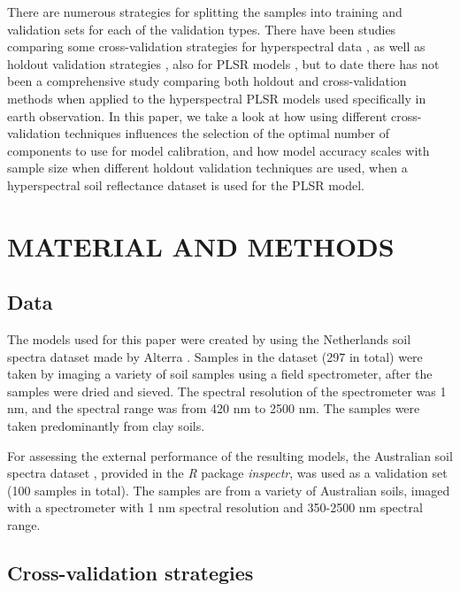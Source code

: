 \documentclass{isprs}
\begin{document}
There are numerous strategies for splitting the samples into training and validation sets for each of the validation types. There have been studies comparing some cross-validation strategies for hyperspectral data \cite{molinaro2005prediction}, as well as holdout validation strategies \cite{roy2008exploring}, also for PLSR models \cite{clark2003boosted}, but to date there has not been a comprehensive study comparing both holdout and cross-validation methods when applied to the hyperspectral PLSR models used specifically in earth observation. In this paper, we take a look at how using different cross-validation techniques influences the selection of the optimal number of components to use for model calibration, and how model accuracy scales with sample size when different holdout validation techniques are used, when a hyperspectral soil reflectance dataset is used for the PLSR model.

\section{MATERIAL AND METHODS}\label{sec:METHODS}

\subsection{Data}\label{sec:Data}

The models used for this paper were created by using the Netherlands soil spectra dataset made by Alterra \cite{groenestijn2009}. Samples in the dataset (297 in total) were taken by imaging a variety of soil samples using a field spectrometer, after the samples were dried and sieved. The spectral resolution of the spectrometer was 1 nm, and the spectral range was from 420 nm to 2500 nm. The samples were taken predominantly from clay soils.

For assessing the external performance of the resulting models, the Australian soil spectra dataset \cite{rossel2010using}, provided in the \textit{R} package \textit{inspectr}, was used as a validation set (100 samples in total). The samples are from a variety of Australian soils, imaged with a spectrometer with 1 nm spectral resolution and 350-2500 nm spectral range.

\subsection{Cross-validation strategies}\label{sec:Cross-validation strategies}
\end{document}
